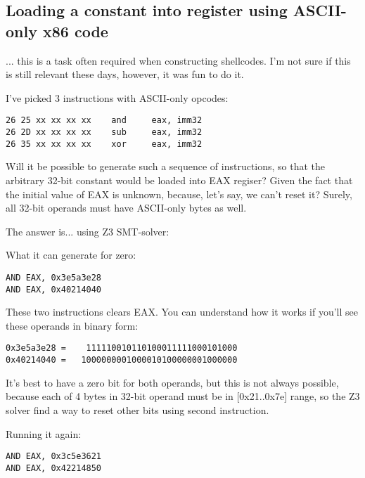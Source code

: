 \subsection{Loading a constant into register using ASCII-only x86 code}

\renewcommand{\CURPATH}{synth/pgm/load}

... this is a task often required when constructing shellcodes.
I'm not sure if this is still relevant these days, however, it was fun to do it.

I've picked 3 instructions with ASCII-only opcodes:

\begin{lstlisting}
26 25 xx xx xx xx    and     eax, imm32
26 2D xx xx xx xx    sub     eax, imm32
26 35 xx xx xx xx    xor     eax, imm32
\end{lstlisting}

Will it be possible to generate such a sequence of instructions, so that the arbitrary 32-bit constant would be loaded
into EAX regiser?
Given the fact that the initial value of EAX is unknown, because, let's say, we can't reset it?
Surely, all 32-bit operands must have ASCII-only bytes as well.

The answer is... using Z3 SMT-solver:



What it can generate for zero:

\begin{lstlisting}
AND EAX, 0x3e5a3e28
AND EAX, 0x40214040
\end{lstlisting}

These two instructions clears EAX. You can understand how it works if you'll see these operands in binary form:

\begin{lstlisting}
0x3e5a3e28 =    111110010110100011111000101000
0x40214040 =   1000000001000010100000001000000
\end{lstlisting}

It's best to have a zero bit for both operands, but this is not always possible, because each of 4 bytes in 32-bit operand
must be in [0x21..0x7e] range, so the Z3 solver find a way to reset other bits using second instruction.

Running it again:

\begin{lstlisting}
AND EAX, 0x3c5e3621
AND EAX, 0x42214850
\end{lstlisting}


